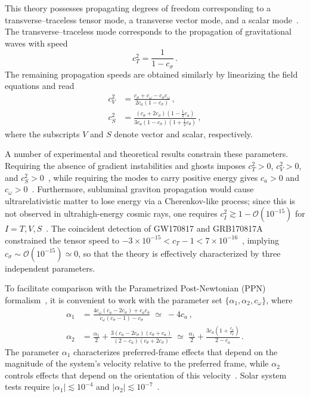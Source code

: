 \documentclass[
    floats,
    floatfix,
    amssymb,
    prd,
    twocolumn,
    superscriptaddress,
    nofootinbib,
    unicode,
    colorlinks=true,
    linktocpage=true
]{revtex4-2}
\begin{document}
This theory possesses propagating degrees of freedom corresponding to a
transverse--traceless tensor mode, a transverse vector mode, and a scalar
mode~\cite{Jacobson:2004ts, Dong:2026xab}. The transverse--traceless mode corresponds
to the propagation of gravitational waves with speed
\begin{equation}\label{eq:cT}
c_T^2 = \frac{1}{1 - c_\sigma}\,.
\end{equation}
The remaining propagation speeds are obtained similarly by linearizing
the field equations and read
\begin{align}
c_V^2 &=
\frac{c_\sigma + c_\omega - c_\sigma c_\omega}
{2 c_a (1 - c_\sigma)}
\,, \label{eq:cV}\\[6pt]
c_S^2 &=
\frac{(c_\theta + 2 c_\sigma)\left(1 - \tfrac{1}{2} c_a\right)}
{3 c_a (1 - c_\sigma)\left(1 + \tfrac{1}{2} c_\theta\right)}
\,, \label{eq:cS}
\end{align}
where the subscripts $V$ and $S$ denote vector and scalar, respectively.

A number of experimental and theoretical results constrain these
parameters. Requiring the absence of gradient instabilities and ghosts
imposes $c_T^2 > 0$, $c_V^2 > 0$, and
$c_S^2 > 0$~\cite{Jacobson:2004ts,Garfinkle:2011iw}, while requiring
the modes to carry positive energy gives $c_a > 0$ and
$c_\omega > 0$~\cite{eling:2005zq}.
Furthermore,  subluminal graviton propagation would cause
ultrarelativistic matter to lose energy via a Cherenkov-like process;
since this is not observed in ultrahigh-energy cosmic rays, one requires
$c_I^2 \gtrsim 1 - \mathcal{O}(10^{-15})$ for
$I = T, V, S$~\cite{Elliott:2005va}.
The coincident detection of GW170817 and GRB170817A constrained the tensor speed to
$-3\times10^{-15} < c_T - 1 < 7\times10^{-16}$~\cite{Monitor:2017mdv},
implying $c_\sigma \sim \mathcal{O}(10^{-15}) \simeq 0$, so that the
theory is effectively characterized by three independent parameters.

To facilitate comparison with the Parametrized Post-Newtonian (PPN)
formalism~\cite{Will:2014kxa,muller:2005sr}, it is convenient to work
with the parameter set $\{\alpha_1, \alpha_2, c_\omega\}$, where
\begin{align}
\alpha_1 &=
\frac{4 c_\omega (c_a - 2 c_\sigma) + c_a c_\sigma}
{c_\omega (c_\sigma - 1) - c_\sigma}
\;\simeq\; -4 c_a\,, \label{eq:alpha1_def}\\[6pt]
\alpha_2 &=
\frac{\alpha_1}{2}
+ \frac{3 (c_a - 2 c_\sigma)(c_\theta + c_a)}
{(2 - c_a)(c_\theta + 2 c_\sigma)}
\;\simeq\;
\frac{\alpha_1}{2}
+ \frac{3 c_a\left(1 + \tfrac{c_a}{c_\theta}\right)}{2 - c_a}\,.
\label{eq:alpha2_def}
\end{align}
The parameter $\alpha_1$ characterizes preferred-frame effects
that depend on the magnitude of the system's velocity relative to the
preferred frame, while $\alpha_2$ controls effects that depend on the
orientation of this velocity~\cite{1972ApJ...177..757W, Foster:2005dk}. Solar system tests
require $|\alpha_1| \lesssim 10^{-4}$ and
$|\alpha_2| \lesssim 10^{-7}$~\cite{Will:2014kxa,muller:2005sr}.
\end{document}
